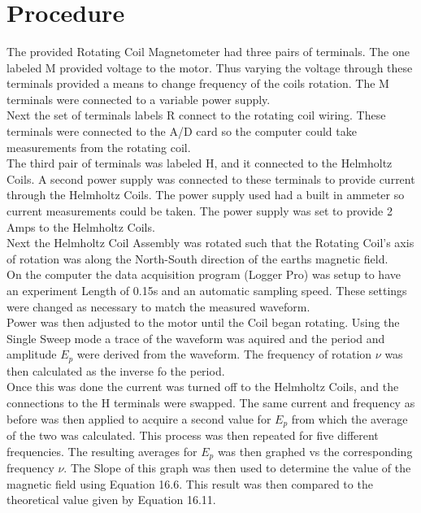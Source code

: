 \documentclass{article}
\begin{document}
\ 

\ 

\ 

\ 

\ 

\ 

\ 

\ 

\ 

\ 

\section{Procedure}
The provided Rotating Coil Magnetometer had three pairs of terminals. The one labeled M provided voltage to the motor. Thus varying the voltage through these terminals provided a means to change frequency of the coils rotation. The M terminals were connected to a variable power supply.\\

Next the set of terminals labels R connect to the rotating coil wiring. These terminals were connected to the A/D card so the computer could take measurements from the rotating coil.\\

The third pair of terminals was labeled H, and it connected to the Helmholtz Coils. A second power supply was connected to these terminals to provide current through the Helmholtz Coils. The power supply used had a built in ammeter so current measurements could be taken. The power supply was set to provide 2 Amps to the Helmholtz Coils.\\

Next the Helmholtz Coil Assembly was rotated such that the Rotating Coil's axis of rotation was along the North-South direction of the earths magnetic field.\\

On the computer the data acquisition program (Logger Pro) was setup to have an experiment Length of 0.15s and an automatic sampling speed. These settings were changed as necessary to match the measured waveform.\\

Power was then adjusted to the motor until the Coil began rotating. Using the Single Sweep mode a trace of the waveform was aquired and the period and amplitude $E_p$ were derived from the waveform. The frequency of rotation $\nu$ was then calculated as the inverse fo the period.\\

Once this was done the current was turned off to the Helmholtz Coils, and the connections to the H terminals were swapped. The same current and frequency as before was then applied to acquire a second value for $E_p$ from which the average of the two was calculated. This process was then repeated for five different frequencies. The resulting averages for $E_p$ was then graphed vs the corresponding frequency $\nu$. The Slope of this graph was then used to determine the value of the magnetic field using Equation 16.6. This result was then compared to the theoretical value given by Equation 16.11.\\
\end{document}
